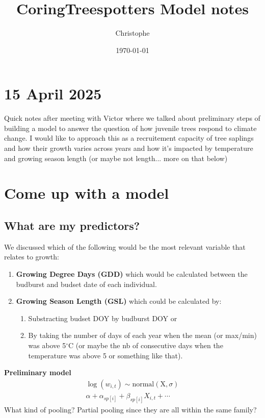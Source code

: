 \documentclass[a4paper,12pt]{article}
\title{CoringTreespotters Model notes}
\author{Christophe}
\date{\today}
\begin{document}
\maketitle

\section*{15 April 2025}
Quick notes after meeting with Victor where we talked about preliminary steps of building a model to answer the question of how juvenile trees respond to climate change. I would like to approach this as a recruitement capacity of tree saplings and how their growth varies across years and how it's impacted by temperature and growing season length (or maybe not length... more on that below)

\section{Come up with a model}

\subsection*{What are my predictors?}
We discussed which of the following would be the most relevant variable that relates to growth:
\begin{enumerate}
	\item \textbf{Growing Degree Days (GDD)} which would be calculated between the budburst and budset date of each individual. 
	\item \textbf{Growing Season Length (GSL)} which could be calculated by:
	\begin{enumerate}
		\item Substracting budset DOY by budburst DOY or 
		\item By taking the number of days of each year when the mean (or max/min) was above 5$^{\circ}$C (or maybe the nb of consecutive days when the temperature was above 5 or something like that).
	\end{enumerate}
\end{enumerate}

\par
\textbf{Preliminary model} \\ 
\begin{align}
	\log (w_{i,t}) \sim \text{normal}(\text{X}, \sigma) \\
	\alpha + \alpha_{sp[i]} + \beta_{sp[i]} X_{i,t} + \cdots
\end{align} 
What kind of pooling? Partial pooling since they are all within the same family?\\
\end{document}
